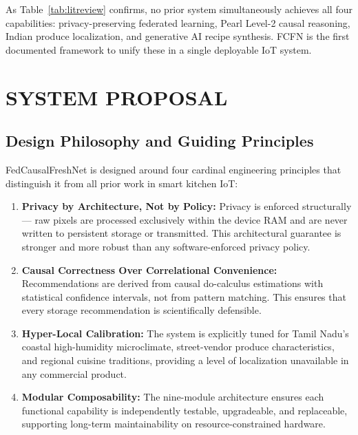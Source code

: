 \documentclass[12pt,a4paper]{report}
\begin{document}
As Table~\ref{tab:litreview} confirms, no prior system simultaneously achieves all four capabilities: privacy-preserving federated learning, Pearl Level-2 causal reasoning, Indian produce localization, and generative AI recipe synthesis. FCFN is the first documented framework to unify these in a single deployable IoT system.

\chapter{SYSTEM PROPOSAL}

\section{Design Philosophy and Guiding Principles}

FedCausalFreshNet is designed around four cardinal engineering principles that distinguish it from all prior work in smart kitchen IoT:

\begin{enumerate}[leftmargin=2em, itemsep=0.2em]
    \item \textbf{Privacy by Architecture, Not by Policy:} Privacy is enforced structurally — raw pixels are processed exclusively within the device RAM and are never written to persistent storage or transmitted. This architectural guarantee is stronger and more robust than any software-enforced privacy policy.
    \item \textbf{Causal Correctness Over Correlational Convenience:} Recommendations are derived from causal do-calculus estimations with statistical confidence intervals, not from pattern matching. This ensures that every storage recommendation is scientifically defensible.
    \item \textbf{Hyper-Local Calibration:} The system is explicitly tuned for Tamil Nadu's coastal high-humidity microclimate, street-vendor produce characteristics, and regional cuisine traditions, providing a level of localization unavailable in any commercial product.
    \item \textbf{Modular Composability:} The nine-module architecture ensures each functional capability is independently testable, upgradeable, and replaceable, supporting long-term maintainability on resource-constrained hardware.
\end{enumerate}
\end{document}
